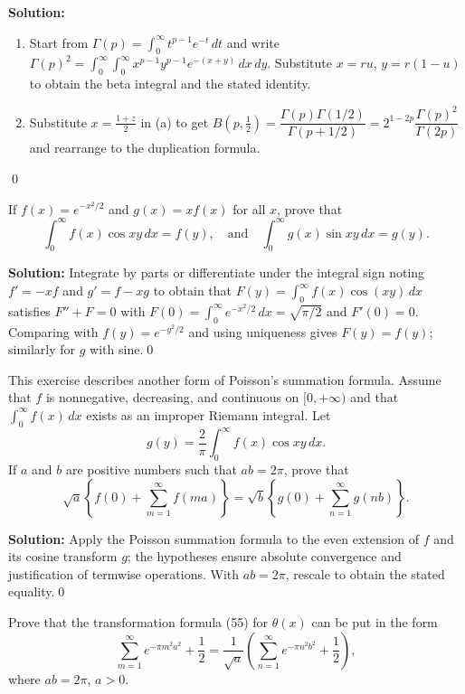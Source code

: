 \noindent\textbf{Solution:}
\begin{enumerate}[label=(\alph*)]
\item Start from $\Gamma(p)=\int_0^{\infty} t^{p-1}e^{-t}\,dt$ and write $\Gamma(p)^2=\int_0^{\infty}\int_0^{\infty} x^{p-1}y^{p-1}e^{-(x+y)}\,dx\,dy$. Substitute $x=ru$, $y=r(1-u)$ to obtain the beta integral and the stated identity.
\item Substitute $x=\tfrac{1+z}{2}$ in (a) to get $B(p,\tfrac12)=\dfrac{\Gamma(p)\Gamma(1/2)}{\Gamma(p+1/2)}=2^{1-2p}\dfrac{\Gamma(p)^2}{\Gamma(2p)}$ and rearrange to the duplication formula.
\end{enumerate}\qed


\begin{problembox}
If $f(x) = e^{-x^2/2}$ and $g(x) = x f(x)$ for all $x$, prove that
\[
\int_0^\infty f(x) \cos xy \, dx = f(y), \quad \text{and} \quad \int_0^\infty g(x) \sin xy \, dx = g(y).
\]
\end{problembox}

\noindent\textbf{Solution:}
Integrate by parts or differentiate under the integral sign noting $f'= -x f$ and $g'= f- x g$ to obtain that $F(y)=\int_0^{\infty} f(x)\cos(xy)\,dx$ satisfies $F''+F=0$ with $F(0)=\int_0^{\infty} e^{-x^2/2}\,dx=\sqrt{\pi/2}$ and $F'(0)=0$. Comparing with $f(y)=e^{-y^2/2}$ and using uniqueness gives $F(y)=f(y)$; similarly for $g$ with sine.\qed


\begin{problembox}
This exercise describes another form of Poisson's summation formula. Assume that $f$ is nonnegative, decreasing, and continuous on $[0, +\infty)$ and that $\int_0^\infty f(x) \, dx$ exists as an improper Riemann integral. Let
\[
g(y) = \frac{2}{\pi} \int_0^\infty f(x) \cos xy \, dx.
\]
If $a$ and $b$ are positive numbers such that $ab = 2\pi$, prove that
\[
\sqrt{a} \left\{ f(0) + \sum_{m=1}^\infty f(ma) \right\} = \sqrt{b} \left\{ g(0) + \sum_{n=1}^\infty g(nb) \right\}.
\]
\end{problembox}

\noindent\textbf{Solution:}
Apply the Poisson summation formula to the even extension of $f$ and its cosine transform $g$; the hypotheses ensure absolute convergence and justification of termwise operations. With $ab=2\pi$, rescale to obtain the stated equality.\qed


\begin{problembox}
Prove that the transformation formula (55) for $\theta(x)$ can be put in the form
\[
\sum_{m=1}^\infty e^{-\pi m^2 a^2} + \frac{1}{2} = \frac{1}{\sqrt{a}} \left( \sum_{n=1}^\infty e^{-\pi n^2 b^2} + \frac{1}{2} \right),
\]
where $ab = 2\pi$, $a > 0$.
\end{problembox}

